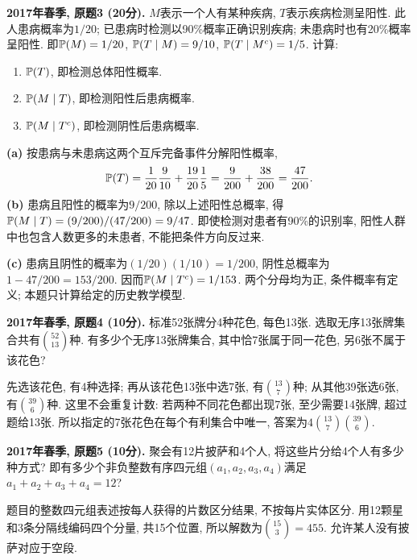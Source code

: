 \begin{exercise}\label{ex:m1-2017s-q3}
\textbf{2017年春季, 原题3 (20分).} $M$表示一个人有某种疾病, $T$表示疾病检测呈阳性. 此人患病概率为$1/20$; 已患病时检测以90\%概率正确识别疾病; 未患病时也有20\%概率呈阳性. 即$\mathbb P(M)=1/20$, $\mathbb P(T\mid M)=9/10$, $\mathbb P(T\mid M^c)=1/5$. 计算:
\begin{enumerate}\item[(a)]\label{ex:m1-2017s-q3-a} $\mathbb P(T)$, 即检测总体阳性概率.\item[(b)]\label{ex:m1-2017s-q3-b} $\mathbb P(M\mid T)$, 即检测阳性后患病概率.\item[(c)]\label{ex:m1-2017s-q3-c} $\mathbb P(M\mid T^c)$, 即检测阴性后患病概率.\end{enumerate}
\end{exercise}
\begin{solution}
\textbf{(a)}\label{sol:m1-2017s-q3-a} 按患病与未患病这两个互斥完备事件分解阳性概率,
\[
\mathbb P(T)=\frac1{20}\frac9{10}+\frac{19}{20}\frac15
=\frac9{200}+\frac{38}{200}=\frac{47}{200}.
\]
\textbf{(b)}\label{sol:m1-2017s-q3-b} 患病且阳性的概率为$9/200$, 除以上述阳性总概率, 得$\mathbb P(M\mid T)=(9/200)/(47/200)=9/47$. 即使检测对患者有90\%的识别率, 阳性人群中也包含人数更多的未患者, 不能把条件方向反过来.

\textbf{(c)}\label{sol:m1-2017s-q3-c} 患病且阴性的概率为$(1/20)(1/10)=1/200$, 阴性总概率为$1-47/200=153/200$. 因而$\mathbb P(M\mid T^c)=1/153$. 两个分母均为正, 条件概率有定义; 本题只计算给定的历史教学模型.
\end{solution}

\begin{exercise}\label{ex:m1-2017s-q4}
\textbf{2017年春季, 原题4 (10分).} 标准52张牌分4种花色, 每色13张. 选取无序13张牌集合共有$\binom{52}{13}$种. 有多少个无序13张牌集合, 其中恰7张属于同一花色, 另6张不属于该花色?
\end{exercise}
\begin{solution}
\label{sol:m1-2017s-q4}
先选该花色, 有4种选择; 再从该花色13张中选7张, 有$\binom{13}{7}$种; 从其他39张选6张, 有$\binom{39}{6}$种. 这里不会重复计数: 若两种不同花色都出现7张, 至少需要14张牌, 超过题给13张. 所以指定的7张花色在每个有利集合中唯一, 答案为$4\binom{13}{7}\binom{39}{6}$.
\end{solution}

\begin{exercise}\label{ex:m1-2017s-q5}
\textbf{2017年春季, 原题5 (10分).} 聚会有12片披萨和4个人, 将这些片分给4个人有多少种方式? 即有多少个非负整数有序四元组$(a_1,a_2,a_3,a_4)$满足$a_1+a_2+a_3+a_4=12$?
\end{exercise}
\begin{solution}
\label{sol:m1-2017s-q5}
题目的整数四元组表述按每人获得的片数区分结果, 不按每片实体区分. 用12颗星和3条分隔线编码四个分量, 共15个位置, 所以解数为$\binom{15}{3}=455$. 允许某人没有披萨对应于空段.
\end{solution}

